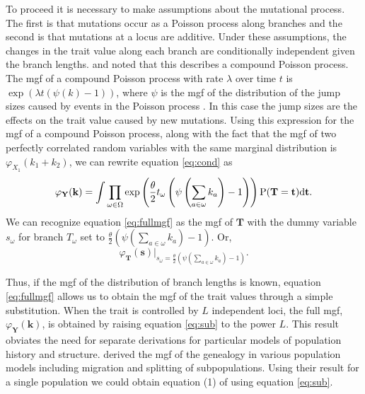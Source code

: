 To proceed it is necessary to make assumptions about the mutational process. The
first is that mutations occur as a Poisson process along branches and the second
is that mutations at a locus are additive. Under these assumptions, the changes
in the trait value along each branch are conditionally independent given the
branch lengths. \citet{Khaitovich2005} and \citet{Schraiber2015} noted that this
describes a compound Poisson process. The mgf of a compound Poisson process with
rate $\lambda$ over time $t$ is $\exp(\lambda t (\psi(k)-1))$, where $\psi$ is
the mgf of the distribution of the jump sizes caused by events in the Poisson
process \citep{kingman-poisson-processes}. In this case the jump sizes are the
effects on the trait value caused by new mutations. Using this expression for
the mgf of a compound Poisson process, along with the fact that the mgf of two
perfectly correlated random variables with the same marginal distribution is
$\varphi_{X_1}(k_1+k_2)$, we can rewrite equation \eqref{eq:cond} as
\begin{equation}
  \label{eq:fullmgf}
  \varphi_{\mathbf{Y}}(\mathbf{k}) = 
  \int \prod_{\omega \in \Omega} \exp\left( \frac{\theta}{2} t_{\omega} \left( \psi\left(\sum_{a \in \omega}k_{a}\right) -1 \right)\right)
  \mathrm{P}(\mathbf{T}=\mathbf{t})\mbox{d}\mathbf{t}.
\end{equation}
We can recognize equation \eqref{eq:fullmgf} as the mgf of $\mathbf{T}$ with the
dummy variable $s_{\omega}$ for branch $T_\omega$ set to
$\frac{\theta}{2} \left( \psi(\sum_{a \in \omega}k_{a}) -1 \right)$. Or,
\begin{equation}
  \label{eq:sub}
  \varphi_{\mathbf{T}}(\mathbf{s})\Bigr|_{s_{\omega}=\frac{\theta}{2} \left( \psi\left(\sum_{a \in \omega}k_{a}\right) -1 \right)}.
\end{equation}

Thus, if the mgf of the distribution of branch lengths is known, equation
\eqref{eq:fullmgf} allows us to obtain the mgf of the trait values through a
simple substitution. When the trait is controlled by $L$ independent loci, the
full mgf, $\varphi_{\mathbf{Y}}(\mathbf{k})$, is obtained by raising
equation \eqref{eq:sub} to the power $L$. This result obviates the need for
separate derivations for particular models of population history and structure.
\citet{Lohse2011} derived the mgf of the genealogy in various population models
including migration and splitting of subpopulations. Using their result for a
single population we could obtain equation (1) of \citet{Schraiber2015} using
equation \eqref{eq:sub}.

